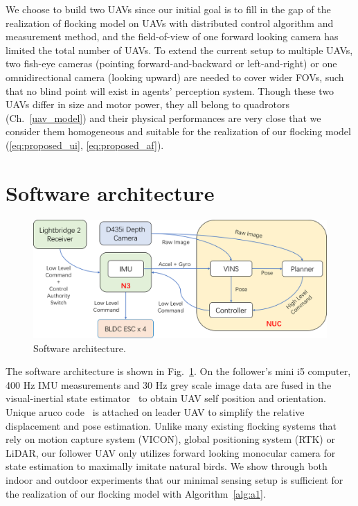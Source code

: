 We choose to build two UAVs since our initial goal is to fill in the gap of the realization of flocking model on UAVs with distributed control algorithm and measurement method, and the field-of-view of one forward looking camera has limited the total number of UAVs. To extend the current setup to multiple UAVs, two fish-eye cameras (pointing forward-and-backward or left-and-right) or one omnidirectional camera (looking upward) are needed to cover wider FOVs, such that no blind point will exist in agents' perception system. Though these two UAVs differ in size and motor power, they all belong to quadrotors (Ch.~\ref{uav_model}) and their physical performances are very close that we consider them homogeneous and suitable for the realization of our flocking model (\ref{eq:proposed_ui}, \ref{eq:proposed_af}).

\section{Software architecture}\label{software}

\begin{figure}[ht]
  \centering
  \includegraphics[width=1.0\textwidth]{figure/chapter_4/system_diagram.png}
  \caption{Software architecture.}
  \label{fig:software_architecture}
\end{figure}

The software architecture is shown in Fig.~\ref{fig:software_architecture}. On the follower's mini i5 computer, 400 Hz IMU measurements and 30 Hz grey scale image data are fused in the visual-inertial state estimator~\cite{VINS} to obtain UAV self position and orientation. Unique aruco code~\cite{Aruco} is attached on leader UAV to simplify the relative displacement and pose estimation. Unlike many existing flocking systems that rely on motion capture system (VICON), global positioning system (RTK) or LiDAR, our follower UAV only utilizes forward looking monocular camera for state estimation to maximally imitate natural birds. We show through both indoor and outdoor experiments that our minimal sensing setup is sufficient for the realization of our flocking model with Algorithm~\ref{alg:a1}.

